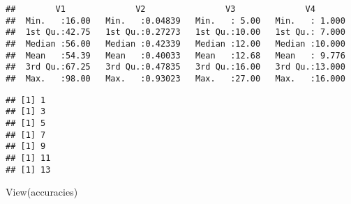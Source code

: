\documentclass[
]{article}
\newenvironment{Shaded}{\begin{snugshade}}{\end{snugshade}}
\newcommand{\AttributeTok}[1]{\textcolor[rgb]{0.77,0.63,0.00}{#1}}
\newcommand{\CommentTok}[1]{\textcolor[rgb]{0.56,0.35,0.01}{\textit{#1}}}
\newcommand{\ControlFlowTok}[1]{\textcolor[rgb]{0.13,0.29,0.53}{\textbf{#1}}}
\newcommand{\DecValTok}[1]{\textcolor[rgb]{0.00,0.00,0.81}{#1}}
\newcommand{\FunctionTok}[1]{\textcolor[rgb]{0.00,0.00,0.00}{#1}}
\newcommand{\NormalTok}[1]{#1}
\newcommand{\OtherTok}[1]{\textcolor[rgb]{0.56,0.35,0.01}{#1}}
\newcommand{\SpecialCharTok}[1]{\textcolor[rgb]{0.00,0.00,0.00}{#1}}
\begin{document}
\begin{verbatim}
##        V1              V2                V3              V4        
##  Min.   :16.00   Min.   :0.04839   Min.   : 5.00   Min.   : 1.000  
##  1st Qu.:42.75   1st Qu.:0.27273   1st Qu.:10.00   1st Qu.: 7.000  
##  Median :56.00   Median :0.42339   Median :12.00   Median :10.000  
##  Mean   :54.39   Mean   :0.40033   Mean   :12.68   Mean   : 9.776  
##  3rd Qu.:67.25   3rd Qu.:0.47835   3rd Qu.:16.00   3rd Qu.:13.000  
##  Max.   :98.00   Max.   :0.93023   Max.   :27.00   Max.   :16.000
\end{verbatim}

\begin{Shaded}
\end{Shaded}

\begin{verbatim}
## [1] 1
## [1] 3
## [1] 5
## [1] 7
## [1] 9
## [1] 11
## [1] 13
\end{verbatim}

\begin{Shaded}
\begin{Highlighting}[]
\FunctionTok{View}\NormalTok{(accuracies)}
\end{Highlighting}
\end{Shaded}
\end{document}

